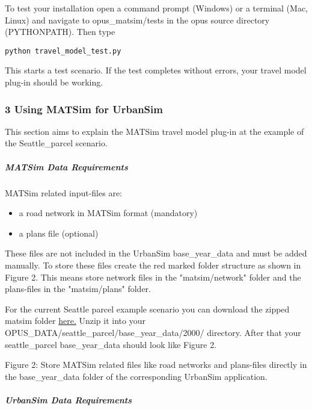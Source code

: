\documentclass[a4paper,11pt]{report}
\begin{document}
To test your installation open a command prompt (Windows) or a  terminal (Mac, Linux) and navigate to opus\_matsim/tests in the opus  source directory (PYTHONPATH). Then type


\texttt{python travel\_model\_test.py}

This starts a test scenario. If the test completes without errors, your travel model plug-in should be working.



\subsubsection{3 Using MATSim for UrbanSim}

This section aims to explain the MATSim travel model plug-in at the example of the Seattle\_parcel scenario.\textbf{}

\subparagraph{MATSim Data Requirements}

MATSim related input-files are:
\begin{itemize}
	\item a road network in MATSim format (mandatory)
	\item a plans file (optional)
\end{itemize}

These files are not included in the UrbanSim base\_year\_data and  must be added manually. To store these files create the red marked  folder structure as shown in Figure 2. This means store network files in  the "matsim/network" folder and the plans-files in the "matsim/plans"  folder.

For the current Seattle parcel example scenario you can download the zipped matsim folder \href{https://svn.vsp.tu-berlin.de/repos/public-svn/matsim/examples/countries/us/seattle/matsim.zip}{here.}  Unzip it into your OPUS\_DATA/seattle\_parcel/base\_year\_data/2000/  directory. After that your seattle\_parcel base\_year\_data should look  like Figure 2.



Figure 2: Store MATSim related files like road networks and  plans-files directly in the base\_year\_data folder of the corresponding  UrbanSim application.

\subparagraph{UrbanSim Data Requirements}
\end{document}
